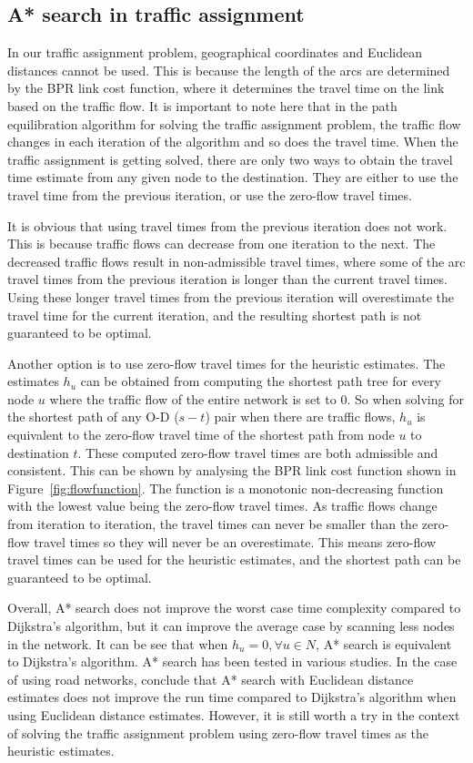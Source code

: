 \subsection{A* search in traffic assignment}
In our traffic assignment problem,
geographical coordinates and Euclidean distances cannot be used.
This is because the length of the arcs are determined by the BPR link cost function,
where it determines the travel time on the link based on the traffic flow.
It is important to note here that in the path equilibration algorithm for solving the traffic assignment problem,
the traffic flow changes in each iteration of the algorithm and so does the travel time.
When the traffic assignment is getting solved,
there are only two ways to obtain the travel time estimate from any given node to the destination.
They are either to use the travel time from the previous iteration,
or use the zero-flow travel times.

It is obvious that using travel times from the previous iteration does not work.
This is because traffic flows can decrease from one iteration to the next.
The decreased traffic flows result in non-admissible travel times,
where some of the arc travel times from the previous iteration is longer than the current travel times.
Using these longer travel times from the previous iteration will overestimate the travel time for the current iteration,
and the resulting shortest path is not guaranteed to be optimal.

Another option is to use zero-flow travel times for the heuristic estimates.
The estimates $h_u$ can be obtained from computing the shortest path tree for every node $u$ where the traffic flow of the entire network is set to 0.
So when solving for the shortest path of any O-D ($s-t$) pair when there are traffic flows,
$h_u$ is equivalent to the zero-flow travel time of the shortest path from node $u$ to destination $t$.
These computed zero-flow travel times are both admissible and consistent.
This can be shown by analysing the BPR link cost function shown in Figure~\ref{fig:flowfunction}.
The function is a monotonic non-decreasing function with the lowest value being the zero-flow travel times.
As traffic flows change from iteration to iteration,
the travel times can never be smaller than the zero-flow travel times so they will never be an overestimate.
This means zero-flow travel times can be used for the heuristic estimates, and the shortest path can be guaranteed to be optimal.

Overall, A* search does not improve the worst case time complexity compared to Dijkstra's algorithm,
but it can improve the average case by scanning less nodes in the network.
It can be see that when $h_u = 0, \forall u \in N$, A* search is equivalent to Dijkstra's algorithm.
A* search has been tested in various studies.
In the case of using road networks,
\citet{GoldbergLandmarks} conclude that A* search with Euclidean distance estimates does not improve the run time compared to Dijkstra's algorithm when using Euclidean distance estimates.
However, it is still worth a try in the context of solving the traffic assignment problem using zero-flow travel times as the heuristic estimates.

